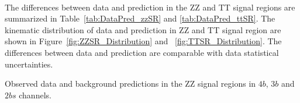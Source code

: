 \paragraph{}
The differences between data and prediction in the ZZ and TT signal regions are summarized in Table~\ref{tab:DataPred_zzSR} and \ref{tab:DataPred_ttSR}. 
The kinematic distribution of data and prediction in ZZ and TT signal region are shown in Figure~\ref{fig:ZZSR_Distribution} and ~\ref{fig:TTSR_Distribution}.
The differences between data and prediction are comparable with data statistical uncertainties. 

% 

% 

% 

\begin{table}[htb!]
\caption{Observed data and background predictions in the ZZ signal regions in $4b$, $3b$ and $2bs$ channels.}
\begin{center}

\label{tab:DataPred_zzSR}
\end{center}
\end{table}

